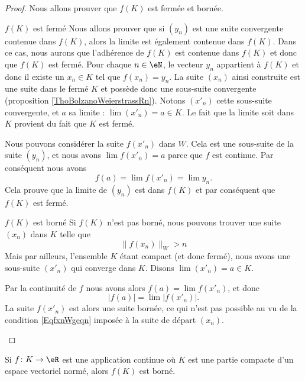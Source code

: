 \begin{proof}
	Nous allons prouver que $f(K)$ est fermée et bornée.
    \begin{subproof}
		\item[$f(K)$ est fermé] Nous allons prouver que si $(y_n)$ est une suite convergente contenue dans $f(K)$, alors la limite est également contenue dans $f(K)$. Dans ce cas, nous aurons que l'adhérence de $f(K)$ est contenue dans $f(K)$ et donc que $f(K)$ est fermé. Pour chaque $n\in\eN$, le vecteur $y_n$ appartient à $f(K)$ et donc il existe un $x_n\in K$ tel que $f(x_n)=y_n$. La suite $(x_n)$ ainsi construite est une suite dans le fermé $K$ et possède donc une sous-suite convergente (proposition \ref{ThoBolzanoWeierstrassRn}). Notons $(x'_n)$ cette sous-suite convergente, et $a$ sa limite : $\lim(x'_n)=a\in K$. Le fait que la limite soit dans $K$ provient du fait que $K$ est fermé.

			Nous pouvons considérer la suite $f(x'_n)$ dans $W$. Cela est une sous-suite de la suite $(y_n)$, et nous avons $\lim f(x'_n)=a$ parce que $f$ est continue. Par conséquent nous avons
			\begin{equation}
				f(a)=\lim f(x'_n)=\lim y_n.
			\end{equation}
			Cela prouve que la limite de $(y_n)$ est dans $f(K)$ et par conséquent que $f(K)$ est fermé.

		\item[$f(K)$ est borné]
			Si $f(K)$ n'est pas borné, nous pouvons trouver une suite $(x_n)$ dans $K$ telle que
			\begin{equation}		\label{EqfxnWgeqn}
				\| f(x_n) \|_W>n
			\end{equation}
			Mais par ailleurs, l'ensemble $K$ étant compact (et donc fermé), nous avons une sous-suite $(x'_n)$ qui converge dans $K$. Disons $\lim(x'_n)=a\in K$. 
			
			Par la continuité de $f$ nous avons alors $f(a)=\lim f(x'_n)$, et donc
			\begin{equation}
				| f(a) |=\lim | f(x'_n) |.
			\end{equation}
			La suite $f(x'_n)$ est alors une suite bornée, ce qui n'est pas possible au vu de la condition \eqref{EqfxnWgeqn} imposée à la suite de départ $(x_n)$.
    \end{subproof}
\end{proof}

\begin{corollary}	\label{CorFnContinueCompactBorne}
	Si $f\colon K\to \eR$ est une application continue où $K$ est une partie compacte d'un espace vectoriel normé, alors \( f(K)\) est borné.
\end{corollary}

